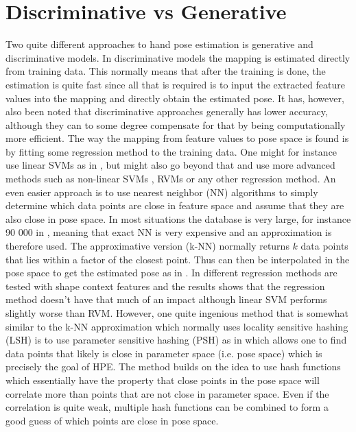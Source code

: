 \documentclass[a4paper,11pt]{kth-mag}
\begin{document}
\section{Discriminative vs Generative}
\label{sec:discgen}
Two quite different approaches to hand pose estimation is generative and discriminative models.
In discriminative models the mapping is estimated directly from training data.
This normally means that after the training is done, the estimation is quite fast since all that is required is to input the extracted feature values into the mapping and directly obtain the estimated pose.
It has, however, also been noted that discriminative approaches generally has lower accuracy, although they can to some degree compensate for that by being computationally more efficient\cite{monocular,recovering3D}.
The way the mapping from feature values to pose space is found is by fitting some regression method to the training data.
One might for instance use linear SVMs as in \cite{3Dhuman}, but might also go beyond that and use more advanced methods such as non-linear SVMs \cite{RGB}, RVMs \cite{regressionBased} or any other regression method.
An even easier approach is to use nearest neighbor (NN) algorithms to simply determine which data points are close in feature space and assume that they are also close in pose space.
In most situations the database is very large, for instance 90 000 in \cite{monocular}, meaning that exact NN is very expensive and an approximation is therefore used.
The approximative version (k-NN) normally returns $k$ data points that lies within a factor of the closest point.
Thus can then be interpolated in the pose space to get the estimated pose as in \cite{monocular}.
In \cite{recovering3D} different regression methods are tested with shape context features and the results shows that the regression method doesn't have that much of an impact although linear SVM performs slightly worse than RVM.
However, one quite ingenious method that is somewhat similar to the k-NN approximation which normally uses locality sensitive hashing (LSH) is to use parameter sensitive hashing (PSH) as in \cite{PSH} which allows one to find data points that likely is close in parameter space (i.e. pose space) which is precisely the goal of HPE.
The method builds on the idea to use hash functions which essentially have the property that close points in the pose space will correlate more than points that are not close in parameter space.
Even if the correlation is quite weak, multiple hash functions can be combined to form a good guess of which points are close in pose space.
\end{document}
